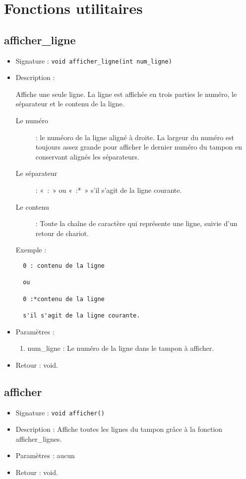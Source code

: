 \documentclass[12pt,pdftex,oneside]{article}
\begin{document}
\section{Fonctions utilitaires}

\subsection{afficher\_ligne}

\begin{itemize}
\item Signature : \texttt{void afficher\_ligne(int num\_ligne)}
\item Description :

Affiche une seule ligne. La ligne est affichée en trois parties le numéro, le séparateur et le contenu de la ligne.

\begin{description}
\item [Le numéro] : le numéoro de la ligne aligné à droite. La largeur du numéro est toujours assez grande pour afficher le dernier numéro du tampon en conservant alignés les séparateurs.
\item [Le séparateur] : «~:~» ou  «~:*~» s'il s'agit de la ligne courante.
\item [Le contenu] : Toute la chaîne de caractère qui représente une ligne, suivie d'un retour de chariot.
\end{description}

Exemple : 
\begin{verbatim}
  0 : contenu de la ligne
  
  ou 
  
  0 :*contenu de la ligne
  
  s'il s'agit de la ligne courante.
\end{verbatim}

\item Paramètres :
  \begin{enumerate}
  \item num\_ligne : Le numéro de la ligne dans le tampon à afficher.
  \end{enumerate}

\item Retour : void.
\end{itemize}

\subsection{afficher}
\begin{itemize}
\item Signature : \texttt{void afficher()}
\item Description :
  Affiche toutes les lignes du tampon grâce à la fonction afficher\_lignes.
\item Paramètres : aucun
\item Retour : void.

\end{itemize}
\end{document}
